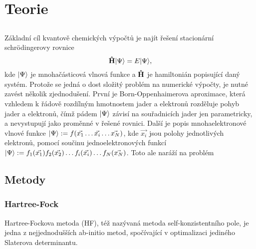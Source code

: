 \chapter{Teorie}
\section{}
Základní cíl kvantově chemických výpočtů je najít řešení stacionární schrödingerovy rovnice
\begin{equation}
\mathbf{\hat{H}}| \Psi \rangle = E| \Psi \rangle,
\end{equation}
kde $| \Psi \rangle$ je mnohačásticová vlnová funkce a $\mathbf{\hat{H}}$ je hamiltonián popisující daný 
systém. Protože se jedná o dost složitý problém na numerické výpočty, je nutné zavést 
několik zjednodušení. První je Born-Oppenhaimerova aproximace, která vzhledem k řádově 
rozdílným hmotnostem jader a elektronů rozděluje pohyb jader a elektronů, čímž pádem 
$| \Psi \rangle$ závisí na souřadnicích jader jen parametricky, 
a nevystupují jako proměnné v 
řešené rovnici. Další je popis mnohaelektronové vlnové funkce
$| \Psi \rangle:= f(\vec{x_1} \dots \vec{x_i} \dots \vec{x_N})$, kde $\vec{x_i}$ jsou 
polohy jednotlivých elektronů, pomocí součinu jednoelektronových funkcí
$| \Psi \rangle:= f_1(\vec{x_1})f_2(\vec{x_2})\dots f_i(\vec{x_i})\dots f_N(\vec{x_N})$.
Toto ale naráží na problém

\section{Metody}
\subsection{Hartree-Fock}
Hartree-Fockova metoda (HF), též nazývaná metoda self-konzistentního pole, je jedna z nejjednodušších ab-initio metod, spočívající v optimalizaci jediného Slaterova determinantu.
